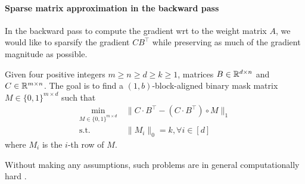 \paragraph{Sparse matrix approximation in the backward pass}
In the backward pass to compute the gradient wrt to the weight matrix $A$, we would like to sparsify the gradient $C B^\top$ while preserving as much of the gradient magnitude as possible.
\begin{definition}\label{def:sparse_mask_factorization_after:informal}
Given four positive integers $m \geq n \geq d \geq k \geq 1$, matrices $B \in \mathbb{R}^{d \times n}$ and $C \in \mathbb{R}^{m \times n}$.
The goal is to find a $(1, b)$-block-aligned binary mask matrix $M \in \{0,1\}^{m \times d}$ such that
\begin{align*}
  \min_{M \in \{0,1\}^{m \times d} } & ~ \| C \cdot B^\top  - ( C \cdot B^\top ) \circ M \|_1 \\
  \mathrm{s.t.}& ~ \| M_i \|_0 = k , \forall i \in [d]
\end{align*}
where $M_i$ is the $i$-th row of $M$.
\end{definition}
Without making any assumptions, such problems are in general computationally hard \cite{fkt15,rsw16}.







